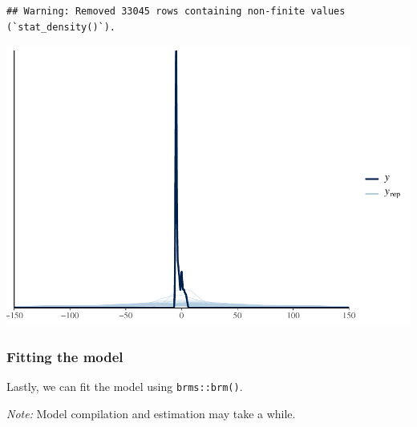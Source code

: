 \documentclass[
  11pt,
]{article}
\begin{document}
\begin{verbatim}
## Warning: Removed 33045 rows containing non-finite values (`stat_density()`).
\end{verbatim}

\begin{center}\includegraphics{02-02-lec_files/figure-latex/brms-priorpc-2-1} \end{center}

\hypertarget{fitting-the-model}{%
\subsubsection{Fitting the model}\label{fitting-the-model}}

Lastly, we can fit the model using \texttt{brms::brm()}.

\emph{Note:} Model compilation and estimation may take a while.
\end{document}
